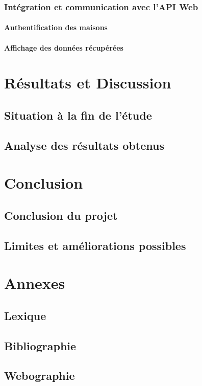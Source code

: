 \documentclass[10pt, a4paper]{report}
\begin{document}
	\subsection{Intégration et communication avec l'API Web}
	\subsubsection{Authentification des maisons}
	\subsubsection{Affichage des données récupérées}
	
	\chapter{Résultats et Discussion}
	\section{Situation à la fin de l’étude}
	\section{Analyse des résultats obtenus}
	
	\chapter{Conclusion}
	\section{Conclusion du projet}
	\section{Limites et améliorations possibles}
	
	\appendix
	\chapter{Annexes}
	\section{Lexique}
	\section{Bibliographie}
	\section{Webographie}
	
	
	
		
	
	\nocite{*}
	
	
	
	\clearpage
	
	\printglossaries
	
	
\end{document}
